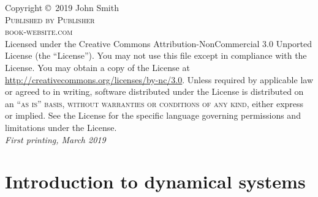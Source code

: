 \documentclass[11pt, fleqn]{book} %
\begin{document}
\noindent Copyright \copyright\ 2019 John Smith\\ %

\noindent \textsc{Published by Publisher}\\ %

\noindent \textsc{book-website.com}\\ %

\noindent Licensed under the Creative Commons Attribution-NonCommercial 3.0 Unported License (the ``License''). You may not use this file except in compliance with the License. You may obtain a copy of the License at \url{http://creativecommons.org/licenses/by-nc/3.0}. Unless required by applicable law or agreed to in writing, software distributed under the License is distributed on an \textsc{``as is'' basis, without warranties or conditions of any kind}, either express or implied. See the License for the specific language governing permissions and limitations under the License.\\ %

\noindent \textit{First printing, March 2019} %


\usechapterimagefalse %


\pagestyle{empty} %

\tableofcontents %

\cleardoublepage %

\pagestyle{fancy} %




\part{Introduction to dynamical systems}
\end{document}
